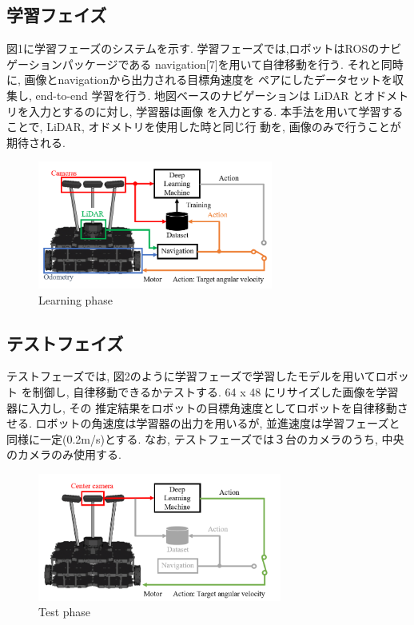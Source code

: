 \documentclass{jarticle}
\begin{document}
\subsection{学習フェイズ}
図1に学習フェーズのシステムを示す. 学習フェーズでは,ロボットはROSのナビゲーションパッケージである
navigation[7]を用いて自律移動を行う. それと同時に, 画像とnavigationから出力される目標角速度を
ペアにしたデータセットを収集し, end-to-end 学習を行う.
地図ベースのナビゲーションは LiDAR とオドメトリを入力とするのに対し, 学習器は画像
を入力とする. 本手法を用いて学習することで, LiDAR, オドメトリを使用した時と同じ行
動を, 画像のみで行うことが期待される. 


\begin{figure}[h!]
  \centering
   \includegraphics[height=42mm]{./figs/ga.png}
   \caption{Learning phase}
\end{figure}


\subsection{テストフェイズ}
テストフェーズでは, 図2のように学習フェーズで学習したモデルを用いてロボット
を制御し, 自律移動できるかテストする. 64 x 48 にリサイズした画像を学習器に入力し, その
推定結果をロボットの目標角速度としてロボットを自律移動させる.
ロボットの角速度は学習器の出力を用いるが, 並進速度は学習フェーズと同様に一定(0.2m/s)とする.
なお, テストフェーズでは３台のカメラのうち, 中央のカメラのみ使用する.

\begin{figure}[h!]
  \centering
   \includegraphics[height=42mm]{./figs/te.png}
   \caption{Test phase}
\end{figure}
\end{document}
